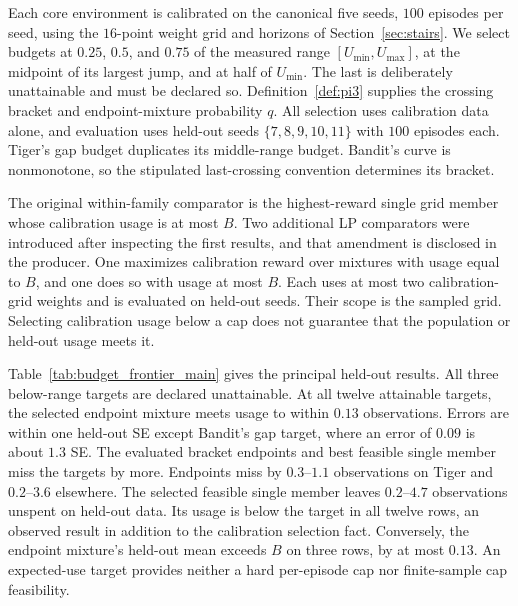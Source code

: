 Each core environment is calibrated on the canonical five seeds, $100$ episodes per seed, using the $16$-point weight grid and horizons of Section~\ref{sec:stairs}. We select budgets at $0.25$, $0.5$, and $0.75$ of the measured range $[U_{\min},U_{\max}]$, at the midpoint of its largest jump, and at half of $U_{\min}$. The last is deliberately unattainable and must be declared so. Definition~\ref{def:pi3} supplies the crossing bracket and endpoint-mixture probability $q$. All selection uses calibration data alone, and evaluation uses held-out seeds $\{7,8,9,10,11\}$ with $100$ episodes each. Tiger's gap budget duplicates its middle-range budget. Bandit's curve is nonmonotone, so the stipulated last-crossing convention determines its bracket.

The original within-family comparator is the highest-reward single grid member whose calibration usage is at most $B$. Two additional LP comparators were introduced after inspecting the first results, and that amendment is disclosed in the producer. One maximizes calibration reward over mixtures with usage equal to $B$, and one does so with usage at most $B$. Each uses at most two calibration-grid weights and is evaluated on held-out seeds. Their scope is the sampled grid. Selecting calibration usage below a cap does not guarantee that the population or held-out usage meets it.

Table~\ref{tab:budget_frontier_main} gives the principal held-out results. All three below-range targets are declared unattainable. At all twelve attainable targets, the selected endpoint mixture meets usage to within $0.13$ observations. Errors are within one held-out SE except Bandit's gap target, where an error of $0.09$ is about $1.3$ SE. The evaluated bracket endpoints and best feasible single member miss the targets by more. Endpoints miss by $0.3$--$1.1$ observations on Tiger and $0.2$--$3.6$ elsewhere. The selected feasible single member leaves $0.2$--$4.7$ observations unspent on held-out data. Its usage is below the target in all twelve rows, an observed result in addition to the calibration selection fact. Conversely, the endpoint mixture's held-out mean exceeds $B$ on three rows, by at most $0.13$. An expected-use target provides neither a hard per-episode cap nor finite-sample cap feasibility.

